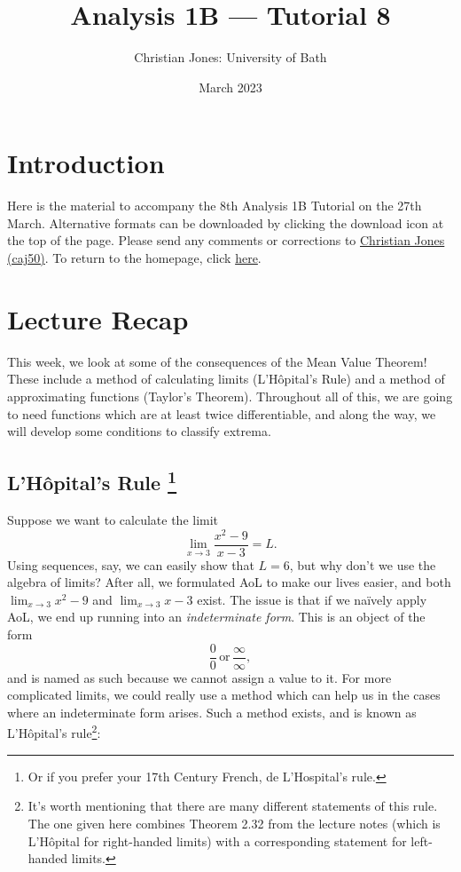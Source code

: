 \documentclass[
  12pt,
  a4paper]{extarticle}
\title{Analysis 1B --- Tutorial 8}
\author{Christian Jones: University of Bath}
\date{March 2023}
\theoremstyle{plain}
\theoremstyle{definition}
\theoremstyle{plain}
\theoremstyle{plain}
\theoremstyle{plain}
\theoremstyle{plain}
\theoremstyle{definition}
\theoremstyle{definition}
\theoremstyle{remark}
\theoremstyle{remark}
\renewcommand{\;}{\,}
\begin{document}
\maketitle

{
\setcounter{tocdepth}{2}
\tableofcontents
}
\newpage
{}

\hypertarget{introduction}{%
\section*{Introduction}\label{introduction}}

Here is the material to accompany the 8th Analysis 1B Tutorial on the 27th March. Alternative formats can be downloaded by clicking the download icon at the top of the page. Please send any comments or corrections to \href{mailto:caj50@bath.ac.uk}{Christian Jones (caj50)}. To return to the homepage, click \href{http://caj50.github.io/tutoring.html}{here}.

\hypertarget{lecture-recap}{%
\section{Lecture Recap}\label{lecture-recap}}

This week, we look at some of the consequences of the Mean Value Theorem! These include a method of calculating limits (L'Hôpital's Rule) and a method of approximating functions (Taylor's Theorem). Throughout all of this, we are going to need functions which are at least twice differentiable, and along the way, we will develop some conditions to classify extrema.

\hypertarget{lhuxf4pitals-rule-1}{%
\subsection[L'Hôpital's Rule ]{\texorpdfstring{L'Hôpital's Rule \footnote{Or if you prefer your 17th Century French, de L'Hospital's rule.}}{L'Hôpital's Rule }}\label{lhuxf4pitals-rule-1}}

Suppose we want to calculate the limit \[\lim_{x \to 3} \frac{x^2 - 9}{x - 3} = L.\] Using sequences, say, we can easily show that \(L = 6\), but why don't we use the algebra of limits? After all, we formulated AoL to make our lives easier, and both \(\lim_{x \to 3} x^2 - 9\) and \(\lim_{x \to 3} x - 3\) exist. The issue is that if we naïvely apply AoL, we end up running into an \emph{indeterminate form}. This is an object of the form \[\frac{0}{0} \; \text{or} \; \frac{\infty}{\infty},\] and is named as such because we cannot assign a value to it. For more complicated limits, we could really use a method which can help us in the cases where an indeterminate form arises. Such a method exists, and is known as L'Hôpital's rule\footnote{It's worth mentioning that there are many different statements of this rule. The one given here combines Theorem 2.32 from the lecture notes (which is L'Hôpital for right-handed limits) with a corresponding statement for left-handed limits.}:
\end{document}
